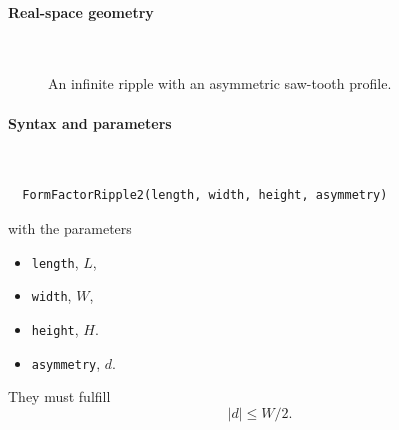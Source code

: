 \paragraph{Real-space geometry}\strut\\

\begin{figure}[H]
\hfill
{}
\hfill
{}
\hfill
{}
\hfill
\caption{An infinite ripple with an asymmetric saw-tooth profile.}
\end{figure}

\FloatBarrier

\paragraph{Syntax and parameters}\strut\\[-2ex plus .2ex minus .2ex]
\begin{lstlisting}
  FormFactorRipple2(length, width, height, asymmetry)
\end{lstlisting}
with the parameters
\begin{itemize}
\item \texttt{length}, $L$,
\item \texttt{width}, $W$,
\item \texttt{height}, $H$.
\item \texttt{asymmetry}, $d$.
\end{itemize}
They must fulfill
\begin{displaymath}
  |d| \le W/2.
\end{displaymath}

